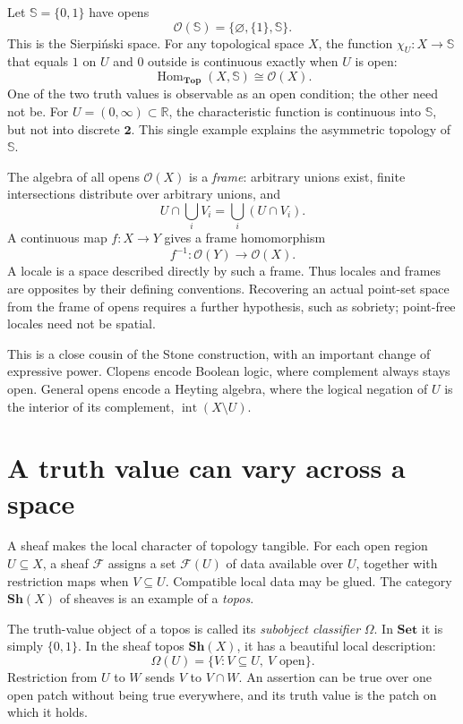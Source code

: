 Let $\mathbb S=\{0,1\}$ have opens
\[
 \mathcal O(\mathbb S)=\{\varnothing,\{1\},\mathbb S\}.
\]
This is the Sierpi\'nski space. For any topological space $X$, the function $\chi_U:X\to\mathbb S$ that equals $1$ on $U$ and $0$ outside is continuous exactly when $U$ is open:
\[
 \boxed{\operatorname{Hom}_{\mathbf{Top}}(X,\mathbb S)
            \cong\mathcal O(X).}
\]
One of the two truth values is observable as an open condition; the other need not be. For $U=(0,\infty)\subset\mathbb R$, the characteristic function is continuous into $\mathbb S$, but not into discrete $\mathbf2$. This single example explains the asymmetric topology of $\mathbb S$.

The algebra of all opens $\mathcal O(X)$ is a \emph{frame}: arbitrary unions exist, finite intersections distribute over arbitrary unions, and
\[
 U\cap\bigcup_i V_i=\bigcup_i(U\cap V_i).
\]
A continuous map $f:X\to Y$ gives a frame homomorphism
\[
 f^{-1}:\mathcal O(Y)\longrightarrow\mathcal O(X).
\]
A locale is a space described directly by such a frame. Thus locales and frames are opposites by their defining conventions. Recovering an actual point-set space from the frame of opens requires a further hypothesis, such as sobriety; point-free locales need not be spatial.

This is a close cousin of the Stone construction, with an important change of expressive power. Clopens encode Boolean logic, where complement always stays open. General opens encode a Heyting algebra, where the logical negation of $U$ is the interior of its complement, $\operatorname{int}(X\setminus U)$.


\section{A truth value can vary across a space}

A sheaf makes the local character of topology tangible. For each open region $U\subseteq X$, a sheaf $\mathcal F$ assigns a set $\mathcal F(U)$ of data available over $U$, together with restriction maps when $V\subseteq U$. Compatible local data may be glued. The category $\mathbf{Sh}(X)$ of sheaves is an example of a \emph{topos}.

The truth-value object of a topos is called its \emph{subobject classifier} $\Omega$. In $\mathbf{Set}$ it is simply $\{0,1\}$. In the sheaf topos $\mathbf{Sh}(X)$, it has a beautiful local description:
\[
 \boxed{\Omega(U)=\{V:V\subseteq U,\ V\text{ open}\}.}
\]
Restriction from $U$ to $W$ sends $V$ to $V\cap W$. An assertion can be true over one open patch without being true everywhere, and its truth value is the patch on which it holds.


